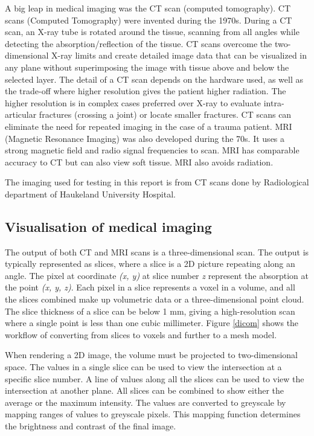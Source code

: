 \documentclass[a4paper]{report}
\begin{document}
A big leap in medical imaging was the CT scan (computed tomography)\cite{bradley_history_2008}.
CT scans (Computed Tomography) were invented during the 1970s. During a CT scan, an X-ray tube is rotated around the tissue, scanning from all angles while detecting the absorption/reflection of the tissue. CT scans overcome the two-dimensional X-ray limits and create detailed image data that can be visualized in any plane without superimposing the image with tissue above and below the selected layer\cite{hamblen_outline_2010}. The detail of a CT scan depends on the hardware used, as well as the trade-off where higher resolution gives the patient higher radiation\cite{bradley_history_2008}. The higher resolution is in complex cases preferred over X-ray to evaluate intra-articular fractures (crossing a joint) or locate smaller fractures\cite{ebnezar_textbook_2016}.
CT scans can eliminate the need for repeated imaging in the case of a trauma patient\cite{swiontkowski_manual_2013}.
MRI (Magnetic Resonance Imaging) was also developed during the 70s. It uses a strong magnetic field and radio signal frequencies to scan. MRI has comparable accuracy to CT but can also view soft tissue. MRI also avoids radiation\cite{swiontkowski_manual_2013}.


The imaging used for testing in this report is from CT scans done by Radiological department of Haukeland University Hospital.

\subsection{Visualisation of medical imaging}

The output of both CT and MRI scans is a three-dimensional scan. The output is typically represented as slices, where a slice is a 2D picture repeating along an angle. The pixel at coordinate \emph{(x, y)} at slice number \emph{z} represent the absorption at the point \emph{(x, y, z)}\cite{chougule_conversions_2013}.
Each pixel in a slice represents a voxel in a volume, and all the slices combined make up volumetric data or a three-dimensional point cloud\cite{chougule_conversions_2013}.
The slice thickness of a slice can be below 1 mm, giving a high-resolution scan where a single point is less than one cubic millimeter\cite{hamblen_outline_2010}. Figure \ref{dicom} shows the workflow of converting from slices to voxels and further to a mesh model.

When rendering a 2D image, the volume must be projected to two-dimensional space. The values in a single slice can be used to view the intersection at a specific slice number. A line of values along all the slices can be used to view the intersection at another plane.
All slices can be combined to show either the average or the maximum intensity\cite{fishman_volume_2006}.
The values are converted to greyscale by mapping ranges of values to greyscale pixels. This mapping function determines the brightness and contrast of the final image.
\end{document}
